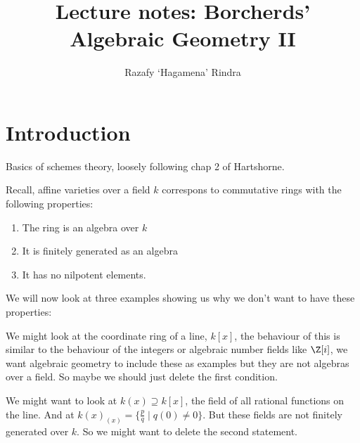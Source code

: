 
\author{Razafy `Hagamena' Rindra}
\title{Lecture notes: Borcherds' Algebraic Geometry II}

\maketitle
\tableofcontents
{}
   \section{Introduction}
   Basics of schemes theory, loosely following chap 2 of Hartshorne.
\begin{remark}
    Recall, affine varieties over a field $k$ correspons to commutative rings with the following properties: \begin{enumerate}[label = (\arabic*)]
    \item The ring is an algebra over $k$
    \item It is finitely generated as an algebra
    \item It has no nilpotent elements.
    \end{enumerate}
\end{remark}
We will now look at three examples showing us why we don't want to have these properties:

\begin{example}
    We might look at the coordinate ring of a line, $k[x]$, the behaviour of this is similar to the behaviour of the integers or algebraic number fields like $\Z[i]$, we want algebraic geometry to include these as examples but they are not algebras over a field.
    So maybe we should just delete the first condition.
\end{example}

\begin{example}[]
We might want to look at $k(x)\supseteq k[x]$, the field of all rational functions on the line. And at  ${k(x)}_{(x)} = \{\frac{p}{q}\mid q(0)\neq 0\}$. But these fields are not finitely generated over $k$. So we might want to delete the second statement.
\end{example}


